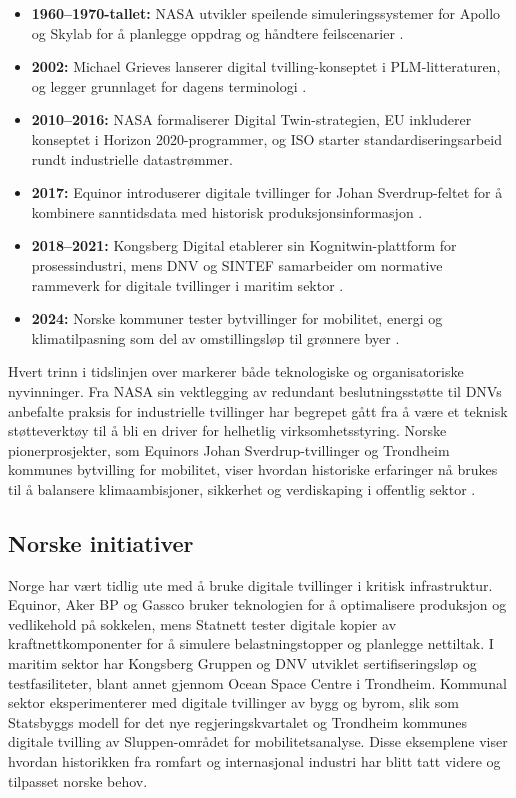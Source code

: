 \begin{itemize}
    \item \textbf{1960--1970-tallet:} NASA utvikler speilende simuleringssystemer for Apollo og Skylab for å planlegge oppdrag og håndtere feilscenarier \citep{glaessgen2012digital}.
    \item \textbf{2002:} Michael Grieves lanserer digital tvilling-konseptet i PLM-litteraturen, og legger grunnlaget for dagens terminologi \citep{grieves2017digital}.
    \item \textbf{2010--2016:} NASA formaliserer Digital Twin-strategien, EU inkluderer konseptet i Horizon 2020-programmer, og ISO starter standardiseringsarbeid rundt industrielle datastrømmer.
    \item \textbf{2017:} Equinor introduserer digitale tvillinger for Johan Sverdrup-feltet for å kombinere sanntidsdata med historisk produksjonsinformasjon \citep{equinor2021johansverdrup}.
    \item \textbf{2018--2021:} Kongsberg Digital etablerer sin Kognitwin-plattform for prosessindustri, mens DNV og SINTEF samarbeider om normative rammeverk for digitale tvillinger i maritim sektor \citep{dnv2021rp,sintef2021digital}.
    \item \textbf{2024:} Norske kommuner tester bytvillinger for mobilitet, energi og klimatilpasning som del av omstillingsløp til grønnere byer \citep{trondheim2024bytvilling}.
\end{itemize}

Hvert trinn i tidslinjen over markerer både teknologiske og organisatoriske nyvinninger. Fra NASA sin vektlegging av redundant beslutningsstøtte til DNVs anbefalte praksis for industrielle tvillinger \citep{dnv2021rp} har begrepet gått fra å være et teknisk støtteverktøy til å bli en driver for helhetlig virksomhetsstyring. Norske pionerprosjekter, som Equinors Johan Sverdrup-tvillinger og Trondheim kommunes bytvilling for mobilitet, viser hvordan historiske erfaringer nå brukes til å balansere klimaambisjoner, sikkerhet og verdiskaping i offentlig sektor \citep{equinor2021johansverdrup,trondheim2024bytvilling}.

\subsection{Norske initiativer}
Norge har vært tidlig ute med å bruke digitale tvillinger i kritisk infrastruktur. Equinor, Aker BP og Gassco bruker teknologien for å optimalisere produksjon og vedlikehold på sokkelen, mens Statnett tester digitale kopier av kraftnettkomponenter for å simulere belastningstopper og planlegge nettiltak. I maritim sektor har Kongsberg Gruppen og DNV utviklet sertifiseringsløp og testfasiliteter, blant annet gjennom Ocean Space Centre i Trondheim. Kommunal sektor eksperimenterer med digitale tvillinger av bygg og byrom, slik som Statsbyggs modell for det nye regjeringskvartalet og Trondheim kommunes digitale tvilling av Sluppen-området for mobilitetsanalyse. Disse eksemplene viser hvordan historikken fra romfart og internasjonal industri har blitt tatt videre og tilpasset norske behov.

